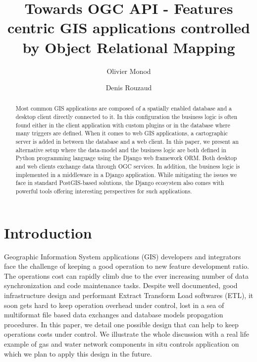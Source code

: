 \documentclass[runningheads]{llncs}
\begin{document}
%
\title{Towards OGC API - Features centric GIS applications controlled by Object Relational Mapping}

%
%
\author{Olivier Monod \and Denis Rouzaud}
%
%
%
\maketitle              %
%
\begin{abstract}
Most common GIS applications are composed of a spatially enabled database and a desktop client directly connected to it. In this configuration the business logic is often found either in the client application with custom plugins or in the database where many triggers are defined. When it comes to web GIS applications, a cartographic server is added in between the database and a web client. In this paper, we present an alternative setup where the data-model and the business logic are both defined in Python programming language using the Django web framework ORM. Both desktop and web clients exchange data through OGC services.  In addition, the business logic is implemented in a middleware in a Django application. While mitigating the issues we face in standard PostGIS-based solutions, the Django ecosystem also comes with powerful tools offering interesting perspectives for such applications.

\end{abstract}
%
%
%
\section{Introduction}

Geographic Information System applications (GIS) developers and integrators face the challenge of keeping a good operation to new feature development ratio. The operations cost can rapidly climb due to the ever increasing number of data synchronization and code maintenance tasks. Despite well documented, good infrastructure design and performant Extract Transform Load softwares (ETL), it soon gets hard to keep operation overhead under control, lost in a sea of multiformat file based data exchanges and database models propagation procedures. In this paper, we detail one possible design that can help to keep operations costs under control. We illustrate the whole discussion with a real life example of gas and water network components in situ controls application on which we plan to apply this design in the future.
\end{document}
